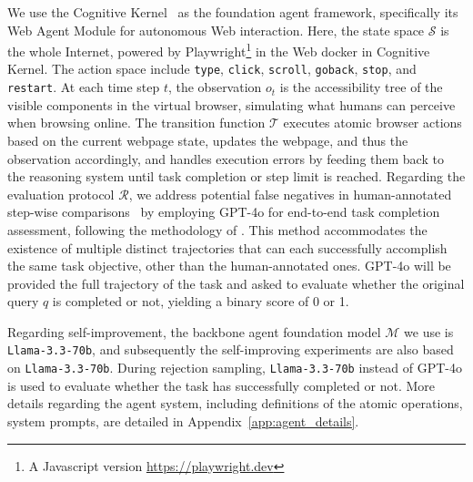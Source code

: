 \documentclass[11pt]{article}
\begin{document}
We use the Cognitive Kernel~\citep{cognitive_kernel} as the foundation agent framework, specifically its Web Agent Module for autonomous Web interaction. 
Here, the state space $\mathcal{S}$ is the whole Internet, powered by Playwright\footnote{A Javascript version \url{https://playwright.dev}} in the Web docker in Cognitive Kernel.
The action space include \texttt{type}, \texttt{click}, \texttt{scroll}, \texttt{goback}, \texttt{stop}, and \texttt{restart}. 
At each time step $t$, the observation $o_t$ is the accessibility tree of the visible components in the virtual browser, simulating what humans can perceive when browsing online. 
The transition function $\mathcal{T}$ executes atomic browser actions based on the current webpage state, updates the webpage, and thus the observation accordingly, 
and handles execution errors by feeding them back to the reasoning system until task completion or step limit is reached.
Regarding the evaluation protocol $\mathcal{R}$, we address potential false negatives in human-annotated step-wise comparisons~\citep{webcanvas} by employing GPT-4o for end-to-end task completion assessment, following the methodology of \citet{webvoyager}. 
This method accommodates the existence of multiple distinct trajectories that can each successfully accomplish the same task objective, other than the human-annotated ones.
GPT-4o will be provided the full trajectory of the task and asked to evaluate whether the original query $q$ is completed or not, yielding a binary score of 0 or 1.

Regarding self-improvement, the backbone agent foundation model $\mathcal{M}$ we use is \texttt{Llama-3.3-70b}, and subsequently the self-improving experiments are also based on \texttt{Llama-3.3-70b}. During rejection sampling, \texttt{Llama-3.3-70b} instead of GPT-4o is used to evaluate whether the task has successfully completed or not.
More details regarding the agent system, including definitions of the atomic operations, system prompts, are detailed in Appendix~\ref{app:agent_details}.

\end{document}
